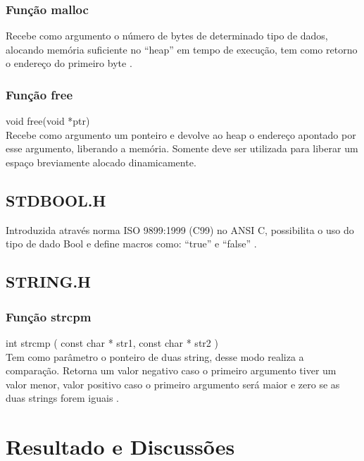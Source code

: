 \documentclass[12pt]{article}
\begin{document}
\subsubsection{Função malloc}

Recebe como argumento o número de bytes de determinado tipo de dados, alocando memória suficiente no ``heap'' em tempo
de execução, tem como retorno o endereço do primeiro byte \cite{schildt:96}.

\subsubsection{Função free}

void free(void *ptr)\\
Recebe como argumento um ponteiro e devolve ao heap o endereço apontado por esse argumento, liberando a memória.
Somente deve ser utilizada para liberar um espaço breviamente alocado dinamicamente\cite{schildt:96}. 

\subsection{STDBOOL.H}

Introduzida através norma ISO 9899:1999 (C99) no ANSI C, possibilita o uso do tipo de dado Bool e define macros como: ``true'' e ``false'' \cite{stroustrup2002sibling}. 

\subsection{STRING.H}

\subsubsection{Função strcpm}

int strcmp ( const char * str1, const char * str2 )\\

Tem como parâmetro o ponteiro de duas string, desse modo realiza a comparação. Retorna um valor negativo caso o primeiro argumento
tiver um valor menor, valor positivo caso o primeiro argumento será maior e zero se as duas strings forem iguais \cite{kernighan1988c}.



\section{Resultado e Discussões}
\end{document}
